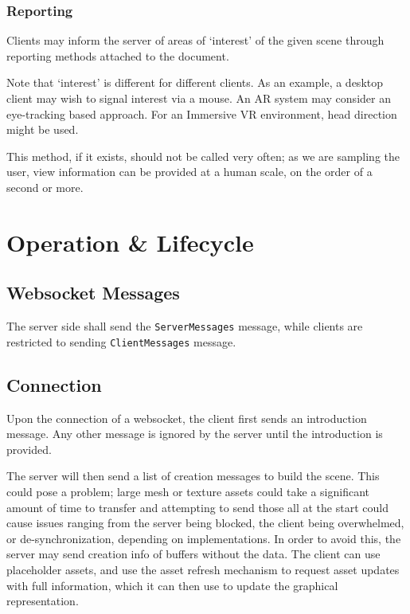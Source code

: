 \documentclass[11pt, oneside]{amsart}
\begin{document}
\subsubsection{Reporting}

Clients may inform the server of areas of `interest' of the given scene through reporting methods attached to the document.



Note that `interest' is different for different clients. As an example, a desktop client may wish to signal interest via a mouse. An AR system may consider an eye-tracking based approach. For an Immersive VR environment, head direction might be used.

This method, if it exists, should not be called very often; as we are sampling the user, view information can be provided at a human scale, on the order of a second or more.


\section{Operation \& Lifecycle}

\subsection{Websocket Messages}
The server side shall send the \texttt{ServerMessages} message, while clients are restricted to sending \texttt{ClientMessages} message.

\subsection{Connection}
Upon the connection of a websocket, the client first sends an introduction message. Any other message is ignored by the server until the introduction is provided.

The server will then send a list of creation messages to build the scene. This could pose a problem; large mesh or texture assets could take a significant amount of time to transfer and attempting to send those all at the start could cause issues ranging from the server being blocked, the client being overwhelmed, or de-synchronization, depending on implementations. In order to avoid this, the server may send creation info of buffers without the data. The client can use placeholder assets, and use the asset refresh mechanism to request asset updates with full information, which it can then use to update the graphical representation.
\end{document}
